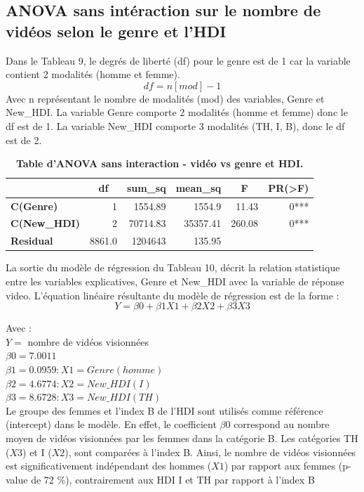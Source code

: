 \documentclass[12pt, a4paper, titlepage, table]{article}
\begin{document}
	\subsection{ANOVA sans intéraction sur le nombre de vidéos selon le genre et l'HDI}
	
	Dans le Tableau 9, le degrés de liberté (df) pour le genre est de 1 car la variable contient 2 modalités (homme et femme).
	\[ df = n[mod] - 1 \]
	Avec n représentant le nombre de modalités (mod) des variables, Genre et New\_HDI.
	La variable Genre comporte 2 modalités (homme et femme) donc le df est de 1. La variable New\_HDI comporte 3 modalités (TH, I, B), donc le df est de 2.
	  
	\begin{table}[H]
		\centering
		\fontsize{12}{20}\selectfont
		\begin{tabular}{|l|r|r|r|r|r|}
			\hline
					\multicolumn{1}{|c|}{\textbf{}}&
					\multicolumn{1}{c|}{\textbf{df}}&
					\multicolumn{1}{c|}{\textbf{sum\_sq}}&
					\multicolumn{1}{c|}{\textbf{mean\_sq}}&
					\multicolumn{1}{c|}{\textbf{F}}&
					\multicolumn{1}{c|}{\textbf{PR(>F)}}\\
			\hline
				\textbf{C(Genre)}&	1&	1554.89&	1554.9&	11.43&	0***\\
				\textbf{C(New\_HDI)}&	2&	70714.83&	35357.41&	260.08&	0***\\
				\textbf{Residual}&	8861.0&	1204643&	135.95&		&		\\
			\hline
		\end{tabular}
		\caption{\textbf{Table d'ANOVA sans interaction - vidéo vs genre et HDI.}}
	\end{table}

	La sortie du modèle de régression du Tableau 10, décrit la relation statistique entre les variables explicatives, Genre et New\_HDI avec la variable de réponse video. L'équation linéaire résultante du modèle de régression est de la forme : 
	\[ Y=\beta0 + \beta1X1 + \beta2X2 + \beta3X3 \]
	
	Avec :\\
	$Y =$ nombre de vidéos visionnées\\
	$\beta0 = 7.0011$\\
	$\beta1 = 0.0959 : X1 = Genre(homme)$\\
	$\beta2 = 4.6774 : X2 = New\_HDI(I)$\\
	$\beta3 = 8.6728 : X3 = New\_HDI(TH)$\\
	
	Le groupe des femmes et l'index B de l'HDI sont utilisés comme référence (intercept) dans le modèle.
	En effet, le coefficient $\beta0$ correspond au nombre moyen de vidéos visionnées par les femmes dans la catégorie B. Les catégories TH ($X3$) et I ($X2$), sont comparées à l'index B.
	Ainsi, le nombre de vidéos visionnées est significativement indépendant des hommes ($X1$) par rapport aux femmes (p-value de 72 \%), contrairement aux HDI I et TH par rapport à l'index B
	
\end{document}
